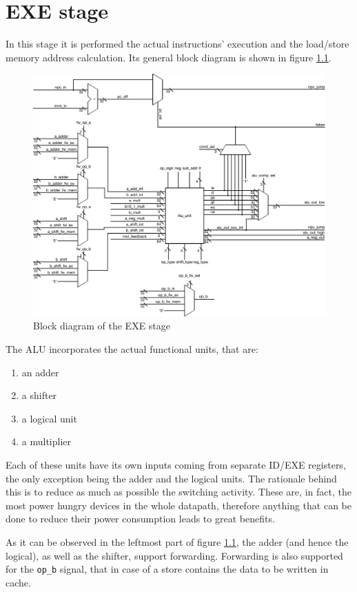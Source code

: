\chapter{EXE stage}
\label{chap:exe}

In this stage it is performed the actual instructions' execution and the load/store memory address calculation.
Its general block diagram is shown in figure \ref{fig:EXE_stage}.

\begin{figure}[!ht]
	\centering
	\includegraphics[width=0.8\linewidth]{./chapters/figures/ex_stage.pdf}
	\caption{Block diagram of the EXE stage}
	\label{fig:EXE_stage}
\end{figure}

The ALU incorporates the actual functional units, that are:

\begin{enumerate}
    \item an adder
    \item a shifter
    \item a logical unit
    \item a multiplier
\end{enumerate}

Each of these units have its own inputs coming from separate ID/EXE registers, the only exception being the adder and the logical units.
The rationale behind this is to reduce as much as possible the switching activity. These are, in fact, the most power hungry devices in the
whole datapath, therefore anything that can be done to reduce their power consumption leads to great benefits.

As it can be observed in the leftmost part of figure \ref{fig:EXE_stage}, the adder (and hence the logical), as well as the shifter, support forwarding.
Forwarding is also supported for the \verb|op_b| signal, that in case of a store contains the data to be written in cache.

